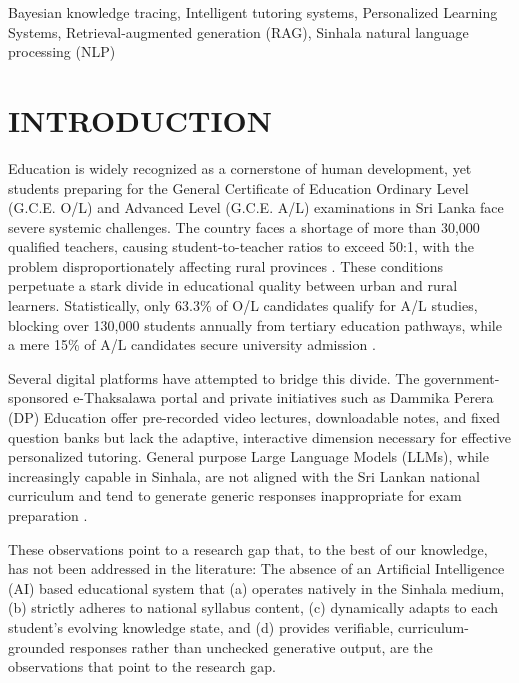 \documentclass[conference]{IEEEtran}
\begin{document}
\renewcommand\IEEEkeywordsname{Keywords}
\begin{IEEEkeywords}
Bayesian knowledge tracing, Intelligent tutoring systems, Personalized Learning Systems, Retrieval-augmented generation (RAG), Sinhala natural language processing (NLP)
\end{IEEEkeywords}
\vspace{-1em}
\section{INTRODUCTION}
Education is widely recognized as a cornerstone of human development, yet students preparing for the General Certificate of Education Ordinary Level (G.C.E. O/L) and Advanced Level (G.C.E. A/L) examinations in Sri Lanka face severe systemic challenges. The country faces a shortage of more than 30,000 qualified teachers, causing student-to-teacher ratios to exceed 50:1, with the problem disproportionately affecting rural provinces \cite{b1}. These conditions perpetuate a stark divide in educational quality between urban and rural learners. Statistically, only 63.3\% of O/L candidates qualify for A/L studies, blocking over 130,000 students annually from tertiary education pathways, while a mere 15\% of A/L candidates secure university admission \cite{b2}. 

Several digital platforms have attempted to bridge this divide. The government-sponsored e-Thaksalawa portal \cite{b3} and private initiatives such as Dammika Perera (DP) Education offer pre-recorded video lectures, downloadable notes, and fixed question banks but lack the adaptive, interactive dimension necessary for effective personalized tutoring. General purpose Large Language Models (LLMs), while increasingly capable in Sinhala, are not aligned with the Sri Lankan national curriculum and tend to generate generic responses inappropriate for exam preparation \cite{b4}.

These observations point to a research gap that, to the best of our knowledge, has not been addressed in the literature: The absence of an Artificial Intelligence (AI) based educational system that (a) operates natively in the Sinhala medium, (b) strictly adheres to national syllabus content, (c) dynamically adapts to each student's evolving knowledge state, and (d) provides verifiable, curriculum-grounded responses rather than unchecked generative output, are the observations that point to the research gap.
\end{document}
